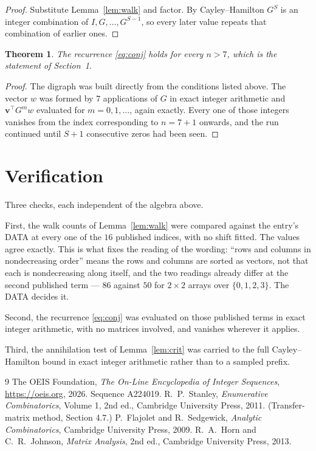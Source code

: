 \documentclass[11pt,a4paper]{article}
\theoremstyle{plain}
\newtheorem{theorem}{Theorem}
\theoremstyle{definition}
\begin{document}
\begin{proof}
Substitute Lemma~\ref{lem:walk} and factor. By Cayley--Hamilton $G^{S}$ is an integer
combination of $I,G,\dots,G^{S-1}$, so every later value repeats that combination of
earlier ones.
\end{proof}

\begin{theorem}
The recurrence \eqref{eq:conj} holds for every $n>7$, which is the statement of
Section~1.
\end{theorem}

\begin{proof}
The digraph was built directly from the conditions listed above. The vector $w$ was formed by
$7$ applications of $G$ in exact integer arithmetic and $\mathbf{v}^{\!\top}G^{m}w$
evaluated for $m=0,1,\dots$, again exactly. Every one of those integers vanishes from the
index corresponding to $n=7+1$ onwards, and the run continued until $S+1$ consecutive
zeros had been seen.
\end{proof}

\section{Verification}

Three checks, each independent of the algebra above.

First, the walk counts of Lemma~\ref{lem:walk} were compared against the entry's DATA at
every one of the $16$ published indices, with no shift fitted. The values agree exactly.
This is what fixes the reading of the wording: ``rows and columns in nondecreasing order''
means the rows and columns are sorted as vectors, not that each is nondecreasing along
itself, and the two readings already differ at the second published term --- $86$ against
$50$ for $2\times2$ arrays over $\{0,1,2,3\}$. The DATA decides it.

Second, the recurrence \eqref{eq:conj} was evaluated on those published terms in exact
integer arithmetic, with no matrices involved, and vanishes wherever it applies.

Third, the annihilation test of Lemma~\ref{lem:crit} was carried to the full
Cayley--Hamilton bound in exact integer arithmetic rather than to a sampled prefix.

\begin{thebibliography}{9}
 The OEIS Foundation, \emph{The On-Line Encyclopedia of Integer
Sequences}, \url{https://oeis.org}, 2026. Sequence A224019.
 R.~P.~Stanley, \emph{Enumerative Combinatorics}, Volume 1, 2nd ed.,
Cambridge University Press, 2011. (Transfer-matrix method, Section 4.7.)
 P.~Flajolet and R.~Sedgewick, \emph{Analytic Combinatorics}, Cambridge
University Press, 2009.
 R.~A.~Horn and C.~R.~Johnson, \emph{Matrix Analysis}, 2nd ed., Cambridge
University Press, 2013.
\end{thebibliography}
\end{document}
